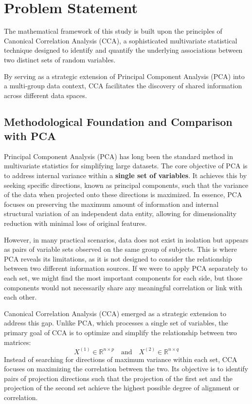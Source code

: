 
\section{Problem Statement}

The mathematical framework of this study is built upon the principles of Canonical Correlation Analysis (CCA), a sophisticated multivariate statistical technique designed to identify and quantify the underlying associations between two distinct sets of random variables. 

By serving as a strategic extension of Principal Component Analysis (PCA) into a multi-group data context, CCA facilitates the discovery of shared information across different data spaces.


\subsection{ Methodological Foundation and Comparison with PCA}

Principal Component Analysis (PCA) has long been the standard method in multivariate statistics for simplifying large datasets. The core objective of PCA is to address internal variance within a \textbf{single set of variables}. It achieves this by seeking specific directions, known as principal components, such that the variance of the data when projected onto these directions is maximized. In essence, PCA focuses on preserving the maximum amount of information and internal structural variation of an independent data entity, allowing for dimensionality reduction with minimal loss of original features.

However, in many practical scenarios, data does not exist in isolation but appears as pairs of variable sets observed on the same group of subjects. This is where PCA reveals its limitations, as it is not designed to consider the relationship between two different information sources. If we were to apply PCA separately to each set, we might find the most important components for each side, but those components would not necessarily share any meaningful correlation or link with each other.



Canonical Correlation Analysis (CCA) emerged as a strategic extension to address this gap. Unlike PCA, which processes a single set of variables, the primary goal of CCA is to optimize and simplify the relationship between two matrices: 
\begin{equation*}
    X^{(1)} \in \mathbb{R}^{n \times p} \quad \text{and} \quad X^{(2)} \in \mathbb{R}^{n \times q}
\end{equation*}
Instead of searching for directions of maximum variance within each set, CCA focuses on maximizing the correlation between the two. Its objective is to identify pairs of projection directions such that the projection of the first set and the projection of the second set achieve the highest possible degree of alignment or correlation.

